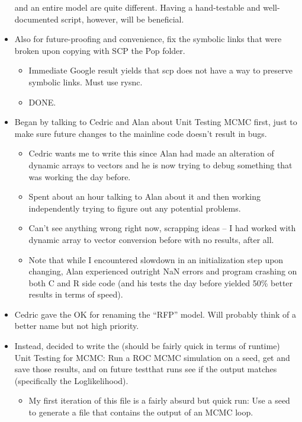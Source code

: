 \documentclass[12pt,hyperref]{labbook}
\begin{document}
\begin{itemize}
    and an entire model are quite different. Having a hand-testable and well-documented 
    script, however, will be beneficial.
    \item Also for future-proofing and convenience, fix the symbolic links that were broken
    upon copying with SCP the Pop folder.
    \begin{itemize}
        \item Immediate Google result yields that scp does not have a way to preserve symbolic
        links. Must use rysnc.
        \item DONE.
    \end{itemize}
\end{itemize}


\begin{itemize}
    \item Began by talking to Cedric and Alan about Unit Testing MCMC first, just to make sure future changes to the mainline code doesn't result in bugs. 
    \begin{itemize}
        \item Cedric wants me to write this since Alan had made an alteration of dynamic arrays to vectors and he is now trying to debug something
that was working the day before.
        \item Spent about an hour talking to Alan about it and then working independently trying to figure out any potential problems.
        \item Can't see anything wrong right now, scrapping ideas -- I had
worked with dynamic array to vector conversion before with no results, after all.
        \item Note that while I encountered slowdown in an initialization step upon changing, Alan experienced outright NaN errors and program crashing on both C and R side code (and his tests the day before yielded 50\% better results in terms of speed).
    \end{itemize}
    \item Cedric gave the OK for renaming the \enquote{RFP} model.
    Will probably think of a better name but not high priority.
    \item Instead, decided to write the (should be fairly quick in terms of runtime) Unit Testing
for MCMC: Run a ROC MCMC simulation on a seed, get and save those results,
and on future testthat runs see if the output matches (specifically the Loglikelihood).
    \begin{itemize}
        \item My first iteration of this file is a fairly absurd but quick run: Use a seed to generate a file that contains the output of an MCMC loop.

\end{itemize}
\end{itemize}
\end{document}
